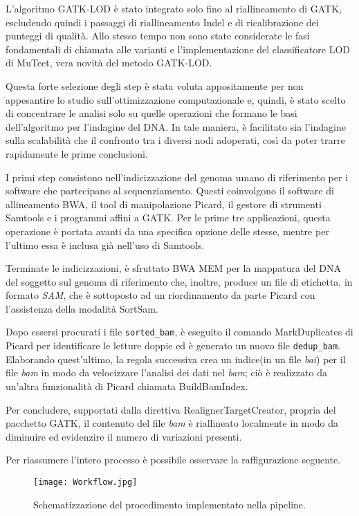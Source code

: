 L'algoritmo GATK-LOD è stato integrato solo fino al riallineamento di GATK, escludendo quindi i passaggi di riallineamento Indel e di ricalibrazione dei punteggi di qualità.
Allo stesso tempo non sono state considerate le fasi fondamentali di chiamata alle varianti e l'implementazione del classificatore LOD di MuTect, vera novità del metodo GATK-LOD.

Questa forte selezione degli step è stata voluta appositamente per non appesantire lo studio sull'ottimizzazione computazionale e, quindi, è stato scelto di concentrare le analisi solo su quelle operazioni che formano le basi dell'algoritmo per l'indagine del DNA.
In tale maniera, è facilitato sia l'indagine sulla scalabilità che il confronto tra i diversi nodi adoperati, così da poter trarre rapidamente le prime conclusioni.

I primi step consistono nell'indicizzazione del genoma umano di riferimento per i software che partecipano al sequenziamento.
Questi coinvolgono il software di allineamento BWA, il tool di manipolazione Picard, il gestore di strumenti Samtools e i programmi affini a GATK.
Per le prime tre  applicazioni, questa operazione è portata avanti da una specifica opzione delle stesse, mentre per l'ultimo essa è inclusa già nell'uso di Samtools.

Terminate le indicizzazioni, è sfruttato BWA MEM per la mappatura del DNA del soggetto sul genoma di riferimento che, inoltre, produce un file di etichetta, in formato \textit{SAM}, che è sottoposto ad un riordinamento da parte Picard con l'assistenza della modalità SortSam.

Dopo essersi procurati i file \verb!sorted_bam!, è eseguito il comando MarkDuplicates di Picard per identificare le letture doppie ed è generato un nuovo file \verb!dedup_bam!.
Elaborando quest'ultimo, la regola successiva crea un indice(in un file \textit{bai}) per il file \textit{bam} in modo da velocizzare l'analisi dei dati nel \textit{bam}; ciò è realizzato da un'altra funzionalità di Picard chiamata BuildBamIndex.

Per concludere, supportati dalla direttiva RealignerTargetCreator, propria del pacchetto GATK, il contenuto del file \textit{bam} è riallineato localmente in modo da diminuire ed evidenzire il numero di variazioni presenti.

Per riassumere l'intero processo è possibile osservare la raffigurazione seguente.
\begin{figure}[H]
\centering
\texttt{[image: Workflow.jpg]}
\caption{Schematizzazione del procedimento implementato nella pipeline.}
\label{fig:workflow}
\end{figure}




